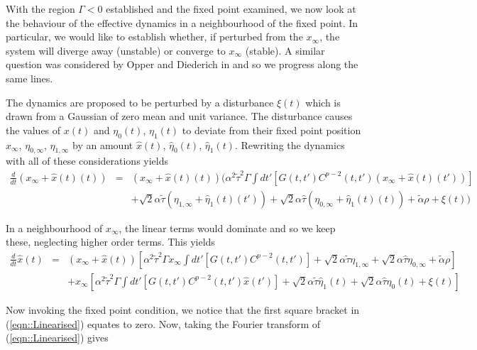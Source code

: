\documentclass{article}
\newcommand{\talpha}{\tilde{\alpha}}
\newcommand{\ttau}{\tilde{\tau}}
\newcommand{\htau}{\hat{\tau}}
\newcommand{\xfixed}{x_\infty}
\newcommand{\ezerof}{\eta_{0, \infty}}
\newcommand{\eonef}{\eta_{1, \infty}}
\newcommand{\xpert}{\hat{x}(t)}
\newcommand{\xpertdash}{\hat{x}(t')}
\newcommand{\ezeropert}{\hat{\eta}_0(t)}
\newcommand{\eonepert}{\hat{\eta}_1(t)}
\begin{document}
With the region $\Gamma < 0$ established and the fixed point examined, we now look at the behaviour of the effective dynamics in a neighbourhood of the fixed point. In particular, we would like to establish whether, if perturbed from the $\xfixed$, the system will diverge away (unstable) or converge to $\xfixed$ (stable). A similar question was considered by Opper and Diederich in \cite{Opper1992} and so we progress along the same lines. 

The dynamics are proposed to be perturbed by a
disturbance $\xi(t)$ which is drawn from a Gaussian of zero mean and
unit variance. The disturbance causes the values of $x(t)$ and
$\eta_0(t)$, $\eta_1(t)$ to deviate from their fixed point position
$\xfixed$, $\ezerof$, $\eonef$ by an amount $\xpert$, $\ezeropert$,
$\eonepert$. Rewriting the dynamics with all of these considerations yields
%
\begin{eqnarray}
            \frac{d}{dt} (\xfixed + \xpert(t)) & = & (\xfixed + \xpert(t)) \Big (\alpha^2 \ttau^2 \Gamma \int dt' \left [G(t, t')C^{p - 2}(t, t') (\xfixed + \xpert(t')) \right ]  \nonumber \\
            & & + \sqrt{2} \alpha \ttau (\eonef + \eonepert(t')) + \sqrt{2} \alpha \htau (\ezerof + \eonepert(t)) + \talpha \rho + \xi(t) \Big )
\end{eqnarray}

In a neighbourhood of $\xfixed$, the linear terms would dominate and so we keep these, neglecting higher order terms. This yields
%
\begin{eqnarray}
\frac{d}{dt} \xpert & = & (\xfixed + \xpert) [ \alpha^2 \ttau^2 \Gamma \xfixed \int dt' [ G(t, t')C^{p - 2}(t, t') ] \nonumber + \sqrt{2} \alpha \ttau \eonef + \sqrt{2} \alpha \htau \ezerof + \talpha \rho] \nonumber \\
& &  + \xfixed [\alpha^2 \ttau^2 \Gamma \int dt' [ G(t, t')C^{p - 2}(t, t') \xpertdash ] + \sqrt{2} \alpha \ttau \eonepert + \sqrt{2} \alpha \htau \ezeropert + \xi(t)]
\label{eqn::Linearised}
\end{eqnarray}

Now invoking the fixed point condition, we notice that the first square bracket in (\ref{eqn::Linearised}) equates to zero. Now, taking the Fourier transform of (\ref{eqn::Linearised}) gives
\end{document}
